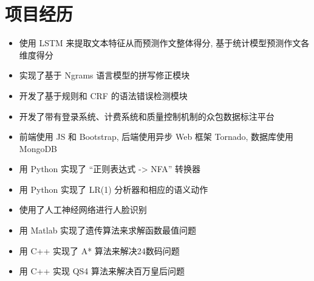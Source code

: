 \section{项目经历}

\begin{itemize}
  \item 使用 LSTM 来提取文本特征从而预测作文整体得分, 基于统计模型预测作文各维度得分
  \item 实现了基于 Ngrams 语言模型的拼写修正模块
  \item 开发了基于规则和 CRF 的语法错误检测模块
\end{itemize}

\begin{itemize}
  \item 开发了带有登录系统、计费系统和质量控制机制的众包数据标注平台
  \item 前端使用 JS 和 Bootstrap, 后端使用异步 Web 框架 Tornado, 数据库使用 MongoDB
\end{itemize}

\begin{itemize}
  \item 用 Python 实现了 ``正则表达式 -> NFA'' 转换器
  \item 用 Python 实现了 LR(1) 分析器和相应的语义动作
\end{itemize}

\begin{itemize}
  \item 使用了人工神经网络进行人脸识别
  \item 用 Matlab 实现了遗传算法来求解函数最值问题
  \item 用 C++ 实现了 A* 算法来解决24数码问题
  \item 用 C++ 实现 QS4 算法来解决百万皇后问题
\end{itemize}

